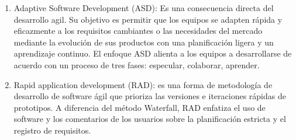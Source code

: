 \begin{enumerate}
        \item Adaptive Software Development (ASD): Es una consecuencia directa del desarrollo agil. Su objetivo es permitir que los equipos se adapten rápida y eficazmente a los requisitos cambiantes o las necesidades del mercado mediante la evolución de sus productos con una planificación ligera y un aprendizaje continuo. El enfoque ASD alienta a los equipos a desarrollarse de acuerdo con un proceso de tres fases: especular, colaborar, aprender. 
        \item Rapid application development (RAD):  es una forma de metodología de desarrollo de software ágil que prioriza las versiones e iteraciones rápidas de prototipos. A diferencia del método Waterfall, RAD enfatiza el uso de software y los comentarios de los usuarios sobre la planificación estricta y el registro de requisitos.
    \end{enumerate}
